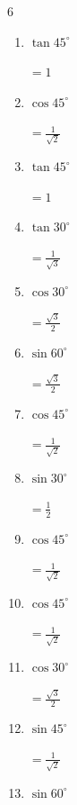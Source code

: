 \begin{multicols}{6}
\begin{enumerate}
  \item $\displaystyle \tan{45^\circ}$

        $\displaystyle =1$

  \item $\displaystyle \cos{45^\circ}$

        $\displaystyle =\frac{1}{\sqrt{2}}$

  \item $\displaystyle \tan{45^\circ}$

        $\displaystyle =1$

  \item $\displaystyle \tan{30^\circ}$

        $\displaystyle =\frac{1}{\sqrt{3}}$

  \item $\displaystyle \cos{30^\circ}$

        $\displaystyle =\frac{\sqrt{3}}{2}$

  \item $\displaystyle \sin{60^\circ}$

        $\displaystyle =\frac{\sqrt{3}}{2}$

  \item $\displaystyle \cos{45^\circ}$

        $\displaystyle =\frac{1}{\sqrt{2}}$

  \item $\displaystyle \sin{30^\circ}$

        $\displaystyle =\frac{1}{2}$

  \item $\displaystyle \cos{45^\circ}$

        $\displaystyle =\frac{1}{\sqrt{2}}$

  \item $\displaystyle \cos{45^\circ}$

        $\displaystyle =\frac{1}{\sqrt{2}}$

  \item $\displaystyle \cos{30^\circ}$

        $\displaystyle =\frac{\sqrt{3}}{2}$

\columnbreak %

  \item $\displaystyle \sin{45^\circ}$

        $\displaystyle =\frac{1}{\sqrt{2}}$

  \item $\displaystyle \sin{60^\circ}$


\end{enumerate}
\end{multicols}
